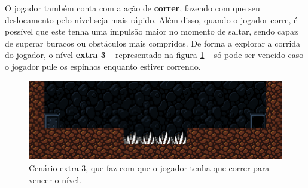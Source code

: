 O jogador também conta com a ação de \textbf{correr}, fazendo com que seu
deslocamento pelo nível seja mais rápido. Além disso, quando o jogador corre, é
possível que este tenha uma impulsão maior no momento de saltar, sendo capaz de
superar buracos ou obstáculos mais compridos. De forma a explorar a corrida do
jogador, o nível \textbf{extra 3} -- representado na figura \ref{fig:extra3} --
só pode ser vencido caso o jogador pule os espinhos enquanto estiver correndo.

\begin{figure}[H]
\centering
\includegraphics[width=\textwidth / 2]{fig/levels/extra3.pdf}
\caption{Cenário extra 3, que faz com que o jogador tenha que correr para
    vencer o nível.}
\label{fig:extra3}
\end{figure}
